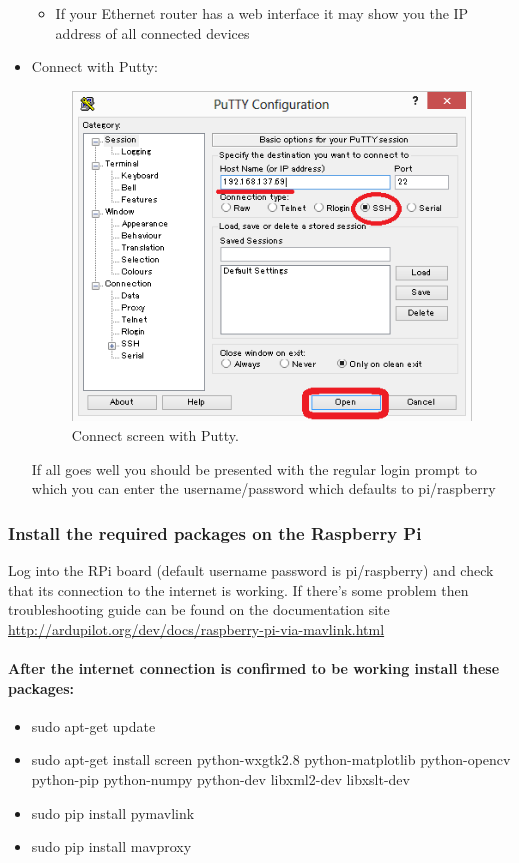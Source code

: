 \documentclass[a4paper,12pt,oneside]{book}
\begin{document}
\begin{itemize}
\begin{itemize}
\begin{figure}[H]
			\end{figure}
		\item If your Ethernet router has a web interface it may show you the IP address of all connected devices
	\end{itemize}	\item Connect with Putty:
		\begin{figure}[H]
	 	\centering
		\includegraphics[scale=0.37]{putty}
	 	\caption{Connect screen with Putty.}
\end{figure}
	If all goes well you should be presented with the regular login prompt to which you can enter the username/password which defaults to pi/raspberry
	 \end{itemize}
	 \subsubsection{Install the required packages on the Raspberry Pi}
	 Log into the RPi board (default username password is pi/raspberry) and check that its connection to the internet is working. If there's some problem then troubleshooting guide can be found on the documentation site \url{http://ardupilot.org/dev/docs/raspberry-pi-via-mavlink.html}
	 \paragraph{After the internet connection is confirmed to be working install these packages:}
	 \begin{itemize}
	 	\item sudo apt-get update
	 	\item sudo apt-get install screen python-wxgtk2.8 python-matplotlib python-opencv python-pip python-numpy python-dev libxml2-dev libxslt-dev
	 	\item sudo pip install pymavlink
	 	\item sudo pip install mavproxy
	 \end{itemize}
\end{document}
